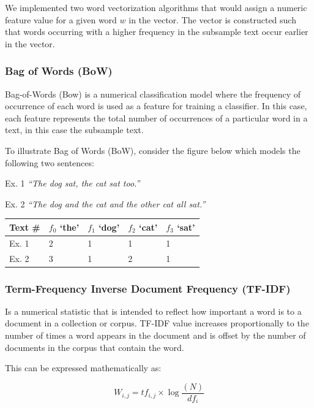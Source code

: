 \documentclass{article}
\begin{document}
We implemented two word vectorization algorithms that would assign a numeric 
  feature value for a given word $w$ in the vector. The vector is constructed such that 
  words occurring with a higher frequency in the subsample text occur earlier in the vector.

\subsubsection{Bag of Words (BoW)}

Bag-of-Words (Bow) is a numerical classification model where the frequency of occurrence of each word is 
  used as a feature for training a classifier. In this case, each feature represents the total 
  number of occurrences of a particular word in a text, in this case the subsample text.

  To illustrate Bag of Words (BoW), consider the figure below which models the following two sentences:
  
  Ex. 1 \textit{``The dog sat, the cat sat too.''}
  
  Ex. 2 \textit{``The dog and the cat and the other cat all sat.''}

  \vspace{-0.15cm}
  \begin{center}
    \begin{tabular}{ | m{1.2cm} | m{1.2cm}| m{1.2cm} | m{1.2cm} | m{1.2cm} | } 
      \hline
      Text \# & $f_0$ `the' & $f_1$ `dog' & $f_2$ `cat' & $f_3$ `sat' \\ 
      \hline
      Ex. 1 & 2 & 1 & 1 & 1 \\ 
      \hline
      Ex. 2 & 3 & 1 & 2 & 1 \\
      \hline
    \end{tabular}
    \end{center}

\subsubsection{Term-Frequency Inverse Document Frequency (TF-IDF)}

Is a numerical statistic that is intended to reflect how important a word is to a document 
  in a collection or corpus. TF-IDF value increases proportionally to the number of times a 
  word appears in the document and is offset by the number of documents in the corpus that 
  contain the word.

This can be expressed mathematically as:
\vspace{-0.1cm}
\begin{large}
  $$W_{i,j}=tf_{i,j}\times \log{\frac{(N)}{df_i}}$$
\end{large}
\end{document}
